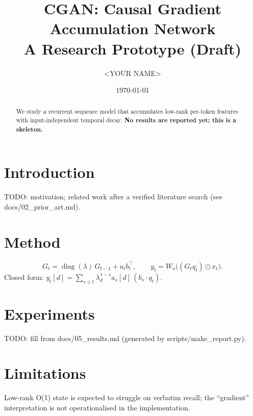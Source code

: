 \documentclass{article}
\title{CGAN: Causal Gradient Accumulation Network\\\large A Research Prototype (Draft)}
\author{<YOUR NAME>}
\date{\today}
\begin{document}
\maketitle
\begin{abstract}
We study a recurrent sequence model that accumulates low-rank per-token features with
input-independent temporal decay. \textbf{No results are reported yet; this is a skeleton.}
\end{abstract}

\section{Introduction}
TODO: motivation; related work after a verified literature search (see docs/02\_prior\_art.md).

\section{Method}
\begin{equation}
G_t = \operatorname{diag}(\lambda)\,G_{t-1} + a_t b_t^{\top},\qquad
y_t = W_o\big((G_t q_t)\odot x_t\big).
\end{equation}
Closed form: $y_t[d]=\sum_{s\le t}\lambda_d^{\,t-s}a_s[d]\,(b_s\!\cdot q_t)$.

\section{Experiments}
TODO: fill from docs/05\_results.md (generated by scripts/make\_report.py).

\section{Limitations}
Low-rank O(1) state is expected to struggle on verbatim recall; the ``gradient'' interpretation is not
operationalised in the implementation.
\end{document}
